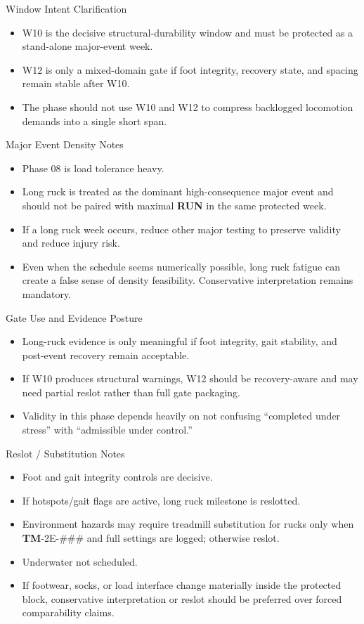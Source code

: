 \documentclass[10pt]{article}
\begin{document}
Window Intent Clarification

\begin{itemize}
\item W10 is the decisive structural-durability window and must be protected as a stand-alone major-event week.
\item W12 is only a mixed-domain gate if foot integrity, recovery state, and spacing remain stable after W10.
\item The phase should not use W10 and W12 to compress backlogged locomotion demands into a single short span.
\end{itemize}

Major Event Density Notes

\begin{itemize}
\item Phase 08 is load tolerance heavy.
\item Long ruck is treated as the dominant high-consequence major event and should not be paired with maximal \textbf{RUN} in the same protected week.
\item If a long ruck week occurs, reduce other major testing to preserve validity and reduce injury risk.
\item Even when the schedule seems numerically possible, long ruck fatigue can create a false sense of density feasibility. Conservative interpretation remains mandatory.
\end{itemize}

Gate Use and Evidence Posture

\begin{itemize}
\item Long-ruck evidence is only meaningful if foot integrity, gait stability, and post-event recovery remain acceptable.
\item If W10 produces structural warnings, W12 should be recovery-aware and may need partial reslot rather than full gate packaging.
\item Validity in this phase depends heavily on not confusing “completed under stress” with “admissible under control.”
\end{itemize}

Reslot / Substitution Notes

\begin{itemize}
\item Foot and gait integrity controls are decisive.
\item If hotspots/gait flags are active, long ruck milestone is reslotted.
\item Environment hazards may require treadmill substitution for rucks only when \textbf{TM}-2E-### and full settings are logged; otherwise reslot.
\item Underwater not scheduled.
\item If footwear, socks, or load interface change materially inside the protected block, conservative interpretation or reslot should be preferred over forced comparability claims.
\end{itemize}
\end{document}
